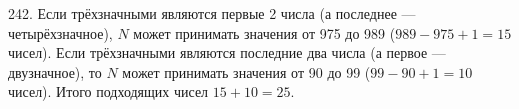 242. Если трёхзначными являются первые 2 числа (а последнее --- четырёхзначное), $N$ может принимать значения от 975 до 989 ($989-975+1=15$ чисел). Если трёхзначными являются последние два числа (а первое --- двузначное), то $N$ может принимать значения от 90 до 99 ($99-90+1=10$ чисел). Итого подходящих чисел $15+10=25.$\\
